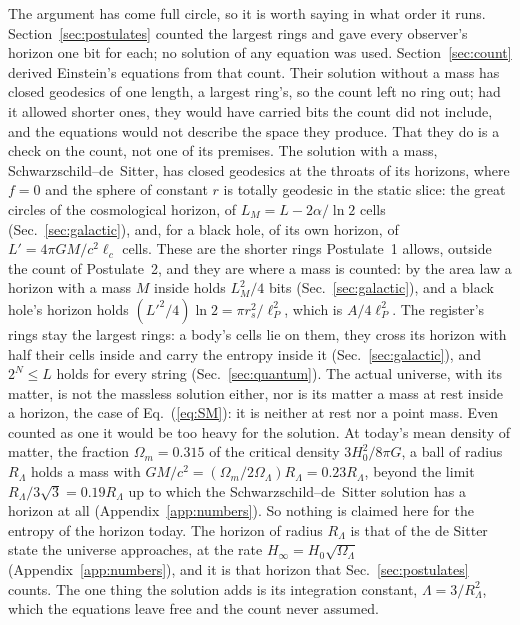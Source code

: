 \documentclass[aps,prd,twocolumn,superscriptaddress,nofootinbib,showkeys]{revtex4-2}
\newcommand{\lc}{\ell_c}
\newcommand{\RL}{R_\Lambda}
\begin{document}
The argument has come full circle, so it is worth saying in what order it runs. Section~\ref{sec:postulates} counted the largest rings and gave every observer's horizon one bit for each; no solution of any equation was used. Section~\ref{sec:count} derived Einstein's equations from that count. Their solution without a mass has closed geodesics of one length, a largest ring's, so the count left no ring out; had it allowed shorter ones, they would have carried bits the count did not include, and the equations would not describe the space they produce. That they do is a check on the count, not one of its premises. The solution with a mass, Schwarzschild--de~Sitter, has closed geodesics at the throats of its horizons, where $f = 0$ and the sphere of constant $r$ is totally geodesic in the static slice: the great circles of the cosmological horizon, of $L_M = L - 2\alpha/\ln2$ cells (Sec.~\ref{sec:galactic}), and, for a black hole, of its own horizon, of $L' = 4\pi GM/c^2\lc$ cells. These are the shorter rings Postulate~1 allows, outside the count of Postulate~2, and they are where a mass is counted: by the area law a horizon with a mass $M$ inside holds $L_M^2/4$ bits (Sec.~\ref{sec:galactic}), and a black hole's horizon holds $(L'^2/4)\ln2 = \pi r_s^2/\ell_P^2$, which is $A/4\ell_P^2$. The register's rings stay the largest rings: a body's cells lie on them, they cross its horizon with half their cells inside and carry the entropy inside it (Sec.~\ref{sec:galactic}), and $2^N\le L$ holds for every string (Sec.~\ref{sec:quantum}). The actual universe, with its matter, is not the massless solution either, nor is its matter a mass at rest inside a horizon, the case of Eq.~(\ref{eq:SM}): it is neither at rest nor a point mass. Even counted as one it would be too heavy for the solution. At today's mean density of matter, the fraction $\Omega_m = 0.315$ of the critical density $3H_0^2/8\pi G$, a ball of radius $\RL$ holds a mass with $GM/c^2 = (\Omega_m/2\Omega_\Lambda)\RL = 0.23\RL$, beyond the limit $\RL/3\sqrt3 = 0.19\RL$ up to which the Schwarzschild--de~Sitter solution has a horizon at all (Appendix~\ref{app:numbers}). So nothing is claimed here for the entropy of the horizon today. The horizon of radius $\RL$ is that of the de Sitter state the universe approaches, at the rate $H_\infty = H_0\sqrt{\Omega_\Lambda}$ (Appendix~\ref{app:numbers}), and it is that horizon that Sec.~\ref{sec:postulates} counts. The one thing the solution adds is its integration constant, $\Lambda = 3/\RL^2$, which the equations leave free and the count never assumed.
\end{document}
